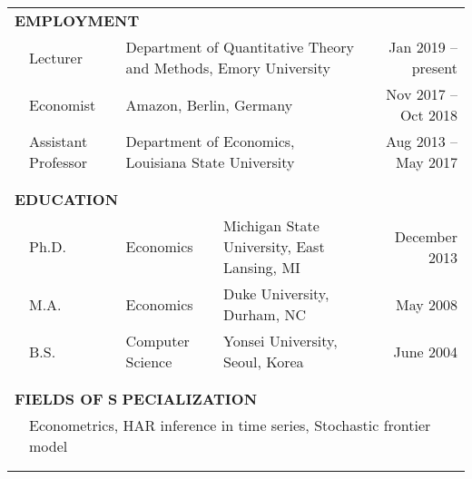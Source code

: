 \documentclass[10pt]{article}
\begin{document}
\begin{center}
\bigskip \bigskip 
\begin{tabular}{llllr}
\multicolumn{5}{l}{{\Large \textbf{E}}\textbf{MPLOYMENT}} \vspace{0.1cm}\\
&\multicolumn{1}{l}{Lecturer} & \multicolumn{2}{l}{Department of Quantitative Theory and Methods, Emory University}& \multicolumn{1}{r}{Jan 2019 -- present}\vspace{0.1cm} \\
&\multicolumn{1}{l}{Economist} & \multicolumn{2}{l}{Amazon, Berlin, Germany}& \multicolumn{1}{r}{Nov 2017 -- Oct 2018}\vspace{0.1cm} \\
&\multicolumn{1}{l}{Assistant Professor} &\multicolumn{2}{l}{Department of Economics, Louisiana State University}& \multicolumn{1}{r}{Aug 2013 -- May 2017} \\
\multicolumn{5}{p{500pt}}{}\\\\
\multicolumn{5}{l}{{\Large \textbf{E}}\textbf{DUCATION}} \vspace{0.1cm}\\
&\multicolumn{1}{l}{Ph.D.} & \multicolumn{1}{l}{Economics}&\multicolumn{1}{l}{Michigan State University, East Lansing, MI}& \multicolumn{1}{r}{December 2013} \\
&\multicolumn{1}{l}{M.A.} & \multicolumn{1}{l}{Economics}& \multicolumn{1}{l}{Duke University, Durham, NC} & \multicolumn{1}{r}{May 2008} \\
&\multicolumn{1}{l}{B.S.} & \multicolumn{1}{l}{Computer Science}& \multicolumn{1}{l}{Yonsei University, Seoul, Korea} & \multicolumn{1}{r}{June 2004} \\
\multicolumn{5}{p{500pt}}{}\\\\
\multicolumn{5}{l}{{\Large \textbf{F}}\textbf{IELDS OF} {\Large \textbf{S}}%
\textbf{PECIALIZATION}} \vspace{0.1cm}\\
& \multicolumn{4}{l}{Econometrics, HAR inference in time series, Stochastic frontier model} \\
\multicolumn{5}{p{500pt}}{}\\\\

\end{tabular}
\end{center}
\end{document}
